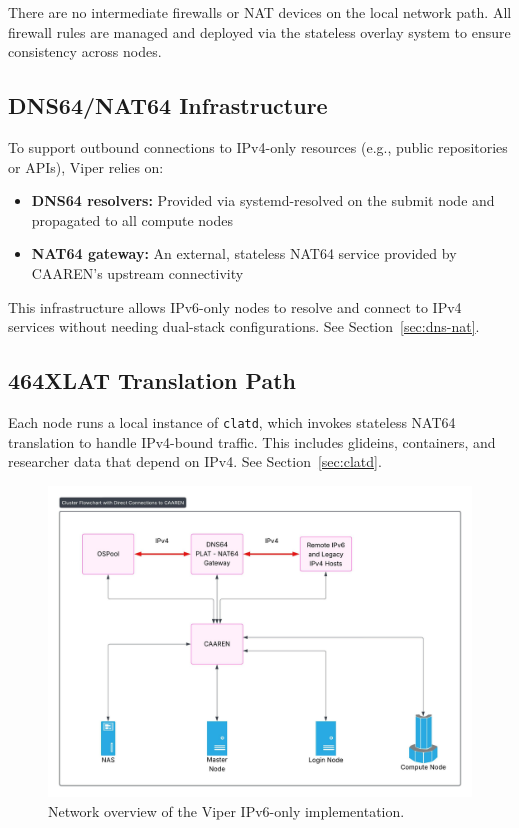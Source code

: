 \documentclass[11pt]{article}
\begin{document}
There are no intermediate firewalls or NAT devices on the local network path. All firewall rules are managed and deployed via the stateless overlay system to ensure consistency across nodes.

\subsection{DNS64/NAT64 Infrastructure}

To support outbound connections to IPv4-only resources (e.g., public repositories or APIs), Viper relies on:
\begin{itemize}[leftmargin=*,label=--,itemsep=1pt]
    \item \textbf{DNS64 resolvers:} Provided via systemd-resolved on the submit node and propagated to all compute nodes
    \item \textbf{NAT64 gateway:} An external, stateless NAT64 service provided by CAAREN’s upstream connectivity 
\end{itemize}

This infrastructure allows IPv6-only nodes to resolve and connect to IPv4 services without needing dual-stack configurations. See Section~\ref{sec:dns-nat}.

\subsection{464XLAT Translation Path}

Each node runs a local instance of \texttt{clatd}, which invokes stateless NAT64 translation to handle IPv4-bound traffic. This includes glideins, containers, and researcher data that depend on IPv4. See Section~\ref{sec:clatd}.



\begin{figure}[htbp]
  \centering
  \includegraphics[width=0.74\linewidth]{Viper_Network.jpeg}
  \caption{Network overview of the Viper IPv6-only implementation.}
  \label{fig:viper-network}
\end{figure}
\end{document}
